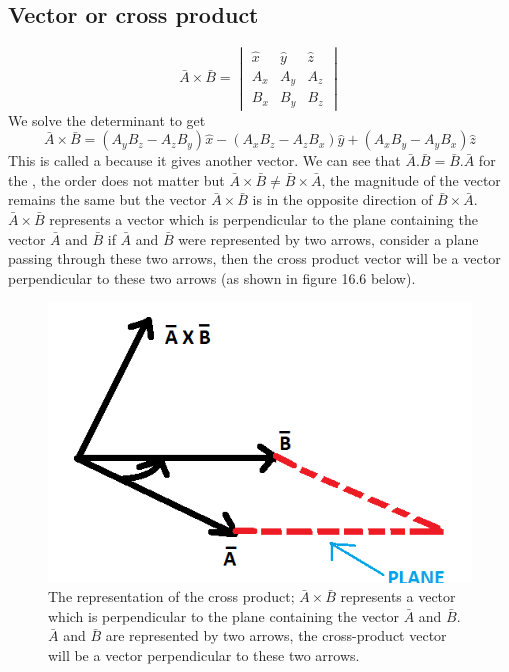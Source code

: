 \subsection{Vector or cross product}

\begin{dmath*}
\bar{A} \times \bar{B} = 
\begin{vmatrix}
\hat{x} & \hat{y} & \hat{z}\\
A_{x} & A_{y} & A_{z} \\
B_{x} & B_{y} & B_{z} 
\end{vmatrix}
\end{dmath*}
We solve the determinant to get 
\begin{dmath}
\bar{A} \times \bar{B} = (A_{y}B_{z} - A_{z}B_{y})\hat{x} - (A_{x}B_{z} - A_{z}B_{x})\hat{y} + (A_{x}B_{y} - A_{y}B_{x})\hat{z}
\end{dmath}
This is called a  because it gives another vector. We can see that $\bar{A}.\bar{B} = \bar{B}.\bar{A} $ for the , the order does not matter but $\bar{A} \times \bar{B} \neq \bar{B} \times \bar{A}$, the magnitude of the vector remains the same but the vector $\bar{A} \times \bar{B}$ is in the opposite direction of $\bar{B} \times \bar{A}$. $\bar{A} \times \bar{B}$ represents a vector which is perpendicular to the plane containing the vector $\bar{A}$ and $\bar{B}$ if $\bar{A}$ and $\bar{B}$ were represented by two arrows, consider a plane passing through these two arrows, then the cross product vector will be a vector perpendicular to these two arrows (as shown in figure 16.6 below).

\begin{figure}[h]
\centering
\includegraphics[width=.7\linewidth]{graphics/vector}
\caption{The representation of the cross product; $\bar{A} \times \bar{B}$ represents a vector which is perpendicular to the plane containing the vector $\bar{A}$ and $\bar{B}$. $\bar{A}$ and $\bar{B}$ are represented by two arrows, the cross-product vector will be a vector perpendicular to these two arrows.}
\end{figure}

